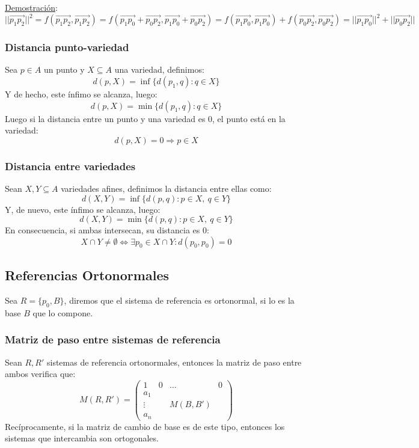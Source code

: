 \documentclass[10pt,a4paper,openright]{book}
\theoremstyle{break}
\begin{document}
\underline{Demostración}:
$$||\vec{p_1p_2}|| ^2 = f(\vec{p_1p_2}, \vec{p_1p_2}) = f(\vec{p_1p_0}+\vec{p_0p_2}, \vec{p_1p_0}+\vec{p_0p_2}) = f (\vec{p_1p_0}, \vec{p_1p_0}) + f(\vec{p_0p_2}, \vec{p_0p_2}) = ||\vec{p_1p_0}||^2 + ||\vec{p_0p_2}||$$

\subsubsection*{Distancia punto-variedad}
Sea $p\in A$ un punto y $X\subseteq A$ una variedad, definimos:
$$d(p,X) = \inf\{d(p_1,q) : q\in X\}$$
Y de hecho, este ínfimo se alcanza, luego:
$$d(p,X) = \min\{d(p_1,q) : q\in X\}$$
Luego si la distancia entre un punto y una variedad es 0, el punto está en la variedad:
$$d(p,X) = 0 \Rightarrow p\in X$$

\subsubsection*{Distancia entre variedades}
Sean $X, Y\subseteq A$ variedades afines, definimos la distancia entre ellas como:
$$d(X,Y) = \inf\{d(p,q) : p\in X, \ q\in Y \}$$
Y, de nuevo, este ínfimo se alcanza, luego:
$$d(X,Y) = \min\{d(p,q) : p\in X, \ q\in Y \}$$
En consecuencia, si ambas intersecan, su distancia es 0:
$$X\cap Y \neq \emptyset \Leftrightarrow \exists p_0 \in X \cap Y: d(p_0,p_0) = 0$$

\subsection{Referencias Ortonormales}
Sea $R = \{p_0, B\}$, diremos que el sistema de referencia es ortonormal, si lo es la base $B$ que lo compone.

\subsubsection*{Matriz de paso entre sistemas de referencia}
Sean $R, R'$ sistemas de referencia ortonormales, entonces la matriz de paso entre ambos verifica que:
$$ M (R, R') = \left(\begin{array}{c|ccc}
1& 0 & \ldots & 0 \\
\hline
a_1 & & &   \\
\vdots & & M(B,B') & \\
a_n & & &
\end{array}
\right)$$
Recíprocamente, si la matriz de cambio de base es de este tipo, entonces los sistemas que intercambia son ortogonales.
\end{document}
